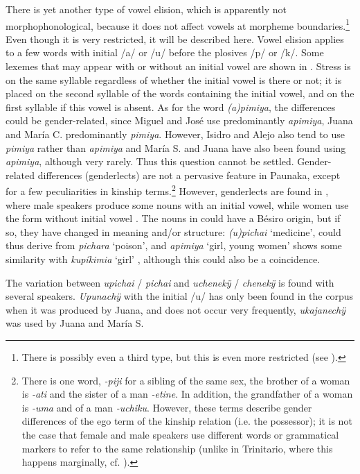 There is yet another type of vowel elision, which is apparently not morpho\-phon\-ological, because it does not affect vowels at morpheme boundaries.\footnote{There is possibly even a third type, but this is even more restricted (see ).} Even though it is very restricted, it will be described here. Vowel elision applies to a few words with initial /a/ or /u/ before the plosives /p/ or /k/. Some lexemes that may appear with or without an initial vowel are shown in . Stress is on the same syllable regardless of whether the initial vowel is there or not; it is placed on the second syllable of the words containing the initial vowel, and on the first syllable if this vowel is absent. As for the word \textit{(a)pimiya}, the differences could be gender-related, since Miguel and José use predominantly \textit{apimiya}, Juana and María C. predominantly \textit{pimiya}. However, Isidro and Alejo also tend to use \textit{pimiya} rather than \textit{apimiya} %
and María S. and Juana have also been found using \textit{apimiya}, although very rarely. %
 Thus this question cannot be settled. Gender-related differences (genderlects) are not a pervasive feature in Paunaka, except for a few peculiarities in kinship terms.\footnote{There is one word, \textit{-piji} for a sibling of the same sex, the brother of a woman is \textit{-ati} and the sister of a man \textit{-etine}. In addition, the grandfather of a woman is \textit{-uma} and of a man \textit{-uchiku}. However, these terms describe gender differences of the ego term of the kinship relation (i.e. the possessor); it is not the case that female and male speakers use different words or grammatical markers to refer to the same relationship (unlike in Trinitario, where this happens marginally, cf. \citealt[]{Rose2013}).} However, genderlects are found in , where male speakers produce some nouns with an initial vowel, while women use the form without initial vowel \citep[]{Nikulin2019a}. The nouns in  could have a Bésiro origin, but if so, they have changed in meaning and/or structure: \textit{(u)pichai} ‘medicine’, could thus derive from \textit{pichara} ‘poison’, and \textit{apimiya} ‘girl, young women’ shows some similarity with \textit{kupíkimia} ‘girl’ \citep[cf.][]{Sans2011}, although this could also be a coincidence. 
 
The variation between \textit{upichai} / \textit{pichai} and \textit{uchenekÿ} / \textit{chenekÿ} is found with several speakers. \textit{Upunachÿ} with the initial /u/ has only been found in the corpus when it was produced by Juana, and does not occur very frequently, \textit{ukajanechÿ} was used by Juana and María S.


